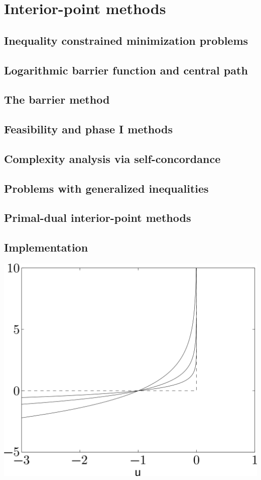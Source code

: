 \chapter{Interior-point methods}

\clearpage
\section{Inequality constrained minimization problems}

\clearpage
\section{Logarithmic barrier function and central path}

\clearpage
\section{The barrier method}

\clearpage
\section{Feasibility and phase I methods}

\clearpage
\section{Complexity analysis via self-concordance}

\clearpage
\section{Problems with generalized inequalities}

\clearpage
\section{Primal-dual interior-point methods}

\clearpage
\section{Implementation}


\clearpage
\hfil\includegraphics[width=.5\textwidth]{../Graphics/563.png}\hfil

